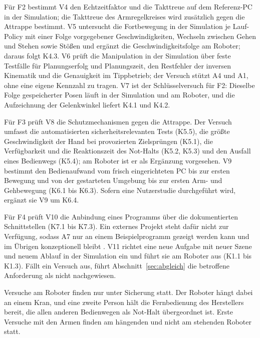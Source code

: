 Für F2 bestimmt V4 den Echtzeitfaktor und die Takttreue auf dem Referenz-PC in der Simulation; die Takttreue des Armregelkreises wird zusätzlich gegen die Attrappe bestimmt.
V5 untersucht die Fortbewegung in der Simulation je Lauf-Policy mit einer Folge vorgegebener Geschwindigkeiten, Wechseln zwischen Gehen und Stehen sowie Stößen und ergänzt die Geschwindigkeitsfolge am Roboter; daraus folgt K4.3.
V6 prüft die Manipulation in der Simulation über feste Testfälle für Planungserfolg und Planungszeit, den Restfehler der inversen Kinematik und die Genauigkeit im Tippbetrieb; der Versuch stützt A4 und A1, ohne eine eigene Kennzahl zu tragen.
V7 ist der Schlüsselversuch für F2: Dieselbe Folge gespeicherter Posen läuft in der Simulation und am Roboter, und die Aufzeichnung der Gelenkwinkel liefert K4.1 und K4.2.

Für F3 prüft V8 die Schutzmechanismen gegen die Attrappe.
Der Versuch umfasst die automatisierten sicherheitsrelevanten Tests (K5.5), die größte Geschwindigkeit der Hand bei provozierten Zielsprüngen (K5.1), die Verfügbarkeit und die Reaktionszeit des Not-Halts (K5.2, K5.3) und den Ausfall eines Bedienwegs (K5.4); am Roboter ist er als Ergänzung vorgesehen.
V9 bestimmt den Bedienaufwand vom frisch eingerichteten PC bis zur ersten Bewegung und von der gestarteten Umgebung bis zur ersten Arm- und Gehbewegung (K6.1 bis K6.3).
Sofern eine Nutzerstudie durchgeführt wird, ergänzt sie V9 um K6.4.

Für F4 prüft V10 die Anbindung eines Programms über die dokumentierten Schnittstellen (K7.1 bis K7.3).
Ein externes Projekt steht dafür nicht zur Verfügung, sodass A7 nur an einem Beispielprogramm gezeigt werden kann und im Übrigen konzeptionell bleibt .
V11 richtet eine neue Aufgabe mit neuer Szene und neuem Ablauf in der Simulation ein und führt sie am Roboter aus (K1.1 bis K1.3).
Fällt ein Versuch aus, führt Abschnitt~\ref{sec:abgleich} die betroffene Anforderung als nicht nachgewiesen.

Versuche am Roboter finden nur unter Sicherung statt.
Der Roboter hängt dabei an einem Kran, und eine zweite Person hält die Fernbedienung des Herstellers bereit, die allen anderen Bedienwegen als Not-Halt übergeordnet ist.
Erste Versuche mit den Armen finden am hängenden und nicht am stehenden Roboter statt.

